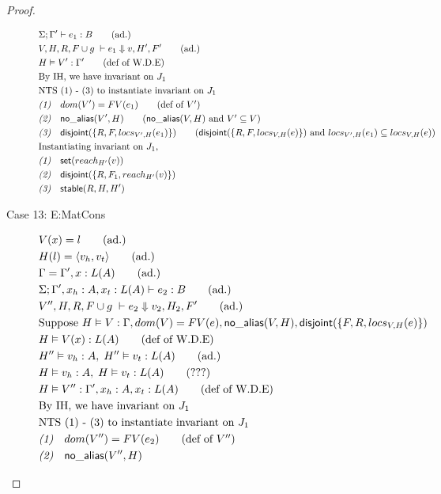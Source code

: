 \documentclass[sigconf]{acmart}
\newcommand{\ms}[1]{\ensuremath{\mathsf{#1}}}
\newcommand{\na}[1]{\mathsf{no\_alias}(#1)}
\newcommand{\stable}[1]{\mathsf{stable}(#1)}
\newcommand{\dist}[1]{\mathsf{disjoint}(#1)}
\theoremstyle{definition}
\begin{document}
\begin{proof}
\begin{description}
\begin{align*}
  &\Sigma; \Gamma' \vdash e_1 : B \tag{ad.}\\
  &V,H,R,F \cup g \; \vdash e_1 \Downarrow v, H',F' \tag{ad.}\\
  &H \vDash V' : \Gamma' \tag{def of W.D.E}\\
  &\text{By IH, we have invariant on } J_1\\
  &\text{NTS (1) - (3) to instantiate invariant on } J_1\\
  &\emph{(1)}\quad dom(V') = FV(e_1) \tag{def of $V'$}\\
  &\emph{(2)}\quad \na{V',H} \tag{$\na{V,H}$ and $V' \subseteq V$}\\
  &\emph{(3)}\quad \dist{\{R,F,locs_{V',H}(e_1)\}} \tag{$\dist{\{R,F,locs_{V,H}(e)\}}$ and $locs_{V',H}(e_1) \subseteq locs_{V,H}(e)$}\\
  &\text{Instantiating invariant on } J_1,\\
  &\emph{(1)}\quad \ms{set}(reach_{H'}(v))\\
  &\emph{(2)}\quad \dist{\{R,F_1,reach_{H'}(v)\}}\\
  &\emph{(3)}\quad \stable{R,H,H'}
  \end{align*}
  \item [Case 13: E:MatCons]
  \begin{align*}
  &V(x) = l \tag{ad.}\\
  &H(l) = \pairexcst{v_h}{v_t} \tag{ad.}\\
  &\Gamma = \Gamma', x : L(A) \tag{ad.}\\
  &\Sigma; \Gamma', x_h : A, x_t : L(A) \vdash e_2 : B \tag{ad.}\\
  &V'',H,R,F \cup g \; \vdash e_2 \Downarrow v_2, H_2, F' \tag{ad.} \\
  &\text{Suppose } H \vDash V : \Gamma, dom(V) = FV(e), \na{V,H},\dist{\{F,R,locs_{V,H}(e)\}}\\
  &H \vDash V(x) : L(A) \tag{def of W.D.E}\\
  &H''\vDash v_h : A,\; H'' \vDash v_t : L(A) \tag{ad.}\\
  &H\vDash v_h : A,\; H \vDash v_t : L(A) \tag{???}\\
  &H \vDash V'' : \Gamma', x_h : A, x_t : L(A) \tag{def of W.D.E}\\
  &\text{By IH, we have invariant on } J_1\\
  &\text{NTS (1) - (3) to instantiate invariant on } J_1\\
  &\emph{(1)}\quad dom(V'') = FV(e_2) \tag{def of $V''$}\\
  &\emph{(2)}\quad \na{V'',H} \\

\end{align*}
\end{description}
\end{proof}
\end{document}
